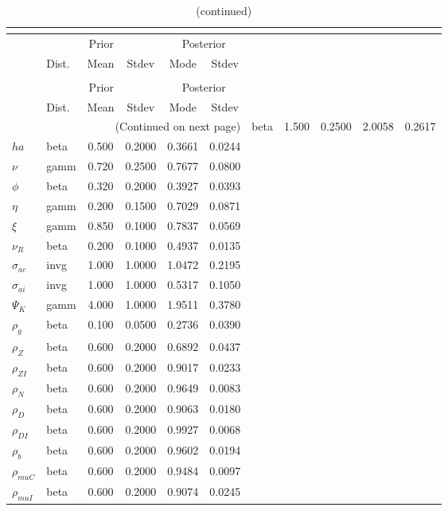  
\begin{center}
\begin{longtable}{llcccc} 
\caption{Results from posterior maximization (parameters)}\\
 \label{Table:Posterior:1}\\
\toprule 
  & \multicolumn{3}{c}{Prior}  &  \multicolumn{2}{c}{Posterior} \\
  \cmidrule(r{.75em}){2-4} \cmidrule(r{.75em}){5-6}
  & Dist. & Mean  & Stdev & Mode & Stdev \\ 
\midrule \endfirsthead 
\caption{(continued)}\\
 \bottomrule 
  & \multicolumn{3}{c}{Prior}  &  \multicolumn{2}{c}{Posterior} \\
  \cmidrule(r{.75em}){2-4} \cmidrule(r{.75em}){5-6}
  & Dist. & Mean  & Stdev & Mode & Stdev \\ 
\midrule \endhead 
\bottomrule \multicolumn{6}{r}{(Continued on next page)}\endfoot 
\bottomrule\endlastfoot 
${\sigma}$ & beta &   1.500 & 0.2500 &   2.0058 &  0.2617 \\ 
${ha}$ & beta &   0.500 & 0.2000 &   0.3661 &  0.0244 \\ 
$\nu$ & gamm &   0.720 & 0.2500 &   0.7677 &  0.0800 \\ 
${\phi}$ & beta &   0.320 & 0.2000 &   0.3927 &  0.0393 \\ 
${\eta}$ & gamm &   0.200 & 0.1500 &   0.7029 &  0.0871 \\ 
$\xi$ & gamm &   0.850 & 0.1000 &   0.7837 &  0.0569 \\ 
${\nu_R}$ & beta &   0.200 & 0.1000 &   0.4937 &  0.0135 \\ 
${\sigma_{ac}}$ & invg &   1.000 & 1.0000 &   1.0472 &  0.2195 \\ 
${\sigma_{ai}}$ & invg &   1.000 & 1.0000 &   0.5317 &  0.1050 \\ 
${\Psi_{K}}$ & gamm &   4.000 & 1.0000 &   1.9511 &  0.3780 \\ 
${\rho_g}$ & beta &   0.100 & 0.0500 &   0.2736 &  0.0390 \\ 
${\rho_Z}$ & beta &   0.600 & 0.2000 &   0.6892 &  0.0437 \\ 
${\rho_{ZI}}$ & beta &   0.600 & 0.2000 &   0.9017 &  0.0233 \\ 
${\rho_N}$ & beta &   0.600 & 0.2000 &   0.9649 &  0.0083 \\ 
${\rho_D}$ & beta &   0.600 & 0.2000 &   0.9063 &  0.0180 \\ 
${\rho_{DI}}$ & beta &   0.600 & 0.2000 &   0.9927 &  0.0068 \\ 
${\rho_b}$ & beta &   0.600 & 0.2000 &   0.9602 &  0.0194 \\ 
${\rho_{muC}}$ & beta &   0.600 & 0.2000 &   0.9484 &  0.0097 \\ 
${\rho_{muI}}$ & beta &   0.600 & 0.2000 &   0.9074 &  0.0245 \\ 
\end{longtable}
 \end{center}
